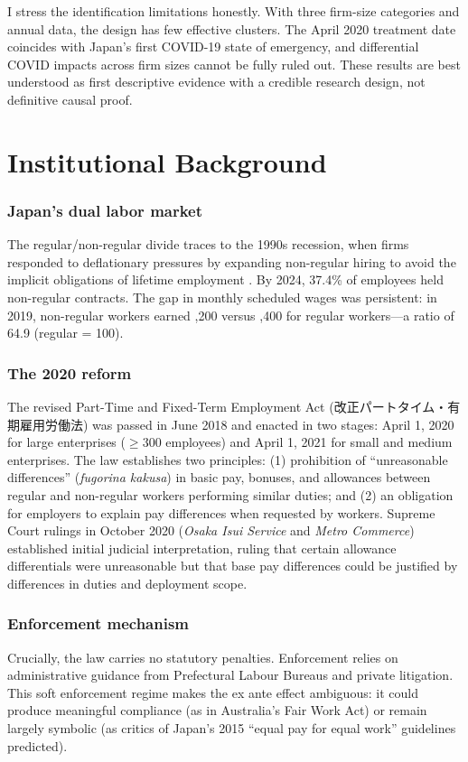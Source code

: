 \documentclass[12pt]{article}
\begin{document}
I stress the identification limitations honestly. With three firm-size categories and annual data, the design has few effective clusters. The April 2020 treatment date coincides with Japan's first COVID-19 state of emergency, and differential COVID impacts across firm sizes cannot be fully ruled out. These results are best understood as first descriptive evidence with a credible research design, not definitive causal proof.

\section{Institutional Background}

\subsubsection*{Japan's dual labor market} The regular/non-regular divide traces to the 1990s recession, when firms responded to deflationary pressures by expanding non-regular hiring to avoid the implicit obligations of lifetime employment \citep{kambayashi2008wage}. By 2024, 37.4\% of employees held non-regular contracts. The gap in monthly scheduled wages was persistent: in 2019, non-regular workers earned ,200 versus ,400 for regular workers---a ratio of 64.9 (regular = 100).

\subsubsection*{The 2020 reform} The revised Part-Time and Fixed-Term Employment Act (改正パートタイム・有期雇用労働法) was passed in June 2018 and enacted in two stages: April 1, 2020 for large enterprises ($\geq$300 employees) and April 1, 2021 for small and medium enterprises. The law establishes two principles: (1) prohibition of ``unreasonable differences'' (\textit{fugorina kakusa}) in basic pay, bonuses, and allowances between regular and non-regular workers performing similar duties; and (2) an obligation for employers to explain pay differences when requested by workers. Supreme Court rulings in October 2020 (\textit{Osaka Isui Service} and \textit{Metro Commerce}) established initial judicial interpretation, ruling that certain allowance differentials were unreasonable but that base pay differences could be justified by differences in duties and deployment scope.

\subsubsection*{Enforcement mechanism} Crucially, the law carries no statutory penalties. Enforcement relies on administrative guidance from Prefectural Labour Bureaus and private litigation. This soft enforcement regime makes the ex ante effect ambiguous: it could produce meaningful compliance (as in Australia's Fair Work Act) or remain largely symbolic (as critics of Japan's 2015 ``equal pay for equal work'' guidelines predicted).
\end{document}
